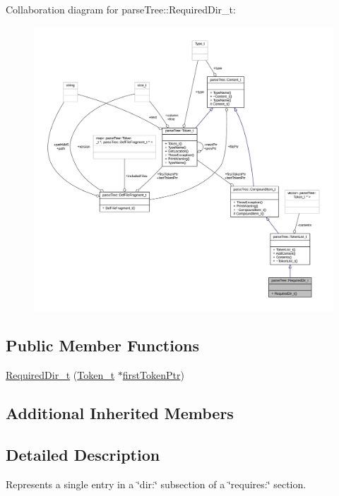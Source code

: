 Collaboration diagram for parse\+Tree\+:\+:Required\+Dir\+\_\+t\+:
\nopagebreak
\begin{figure}[H]
\begin{center}
\leavevmode
\includegraphics[width=350pt]{structparse_tree_1_1_required_dir__t__coll__graph}
\end{center}
\end{figure}
\subsection*{Public Member Functions}
\begin{DoxyCompactItemize}
\item 
\hyperlink{structparse_tree_1_1_required_dir__t_a7364f3394eeef976b822cec5630cf5f6}{Required\+Dir\+\_\+t} (\hyperlink{structparse_tree_1_1_token__t}{Token\+\_\+t} $\ast$\hyperlink{structparse_tree_1_1_compound_item__t_a587020c943e760cb0152dd8cd31e21ef}{first\+Token\+Ptr})
\end{DoxyCompactItemize}
\subsection*{Additional Inherited Members}


\subsection{Detailed Description}
Represents a single entry in a \char`\"{}dir\+:\char`\"{} subsection of a \char`\"{}requires\+:\char`\"{} section. 

